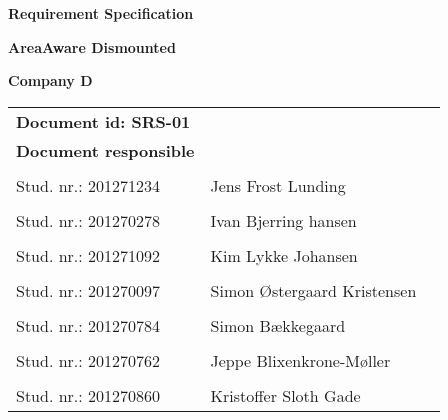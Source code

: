 
\centerline{\Huge\bfseries\color{ThemeColor} Requirement Specification } 

\vspace{1em}
\centerline{\Large\bfseries\color{BlackColor} AreaAware Dismounted} 

\vspace{5em}
\centerline{\large\bfseries\color{BlackColor}Company D} 




\begin{center}
	\begin{tabular}{ l l p{6cm} }
		\textbf{Document id: SRS-01}& & \\
		\textbf{Document responsible}& & \\
		& & \\
		Stud. nr.: 201271234 & Jens Frost Lunding & \\\hline
		& & \\
		Stud. nr.: 201270278 & Ivan Bjerring hansen & \\\hline
		& & \\
		Stud. nr.: 201271092 & Kim Lykke Johansen & \\\hline
		& & \\	
		Stud. nr.: 201270097 & Simon Østergaard Kristensen & \\\hline
		& & \\
		Stud. nr.: 201270784  & Simon Bækkegaard & \\\hline
		& & \\
		Stud. nr.: 	201270762 & Jeppe Blixenkrone-Møller & \\\hline
		& & \\
		Stud. nr.: 	201270860 & Kristoffer Sloth Gade & \\\hline
	\end{tabular}     	
\end{center}
\thispagestyle{empty} %
\restoregeometry



		